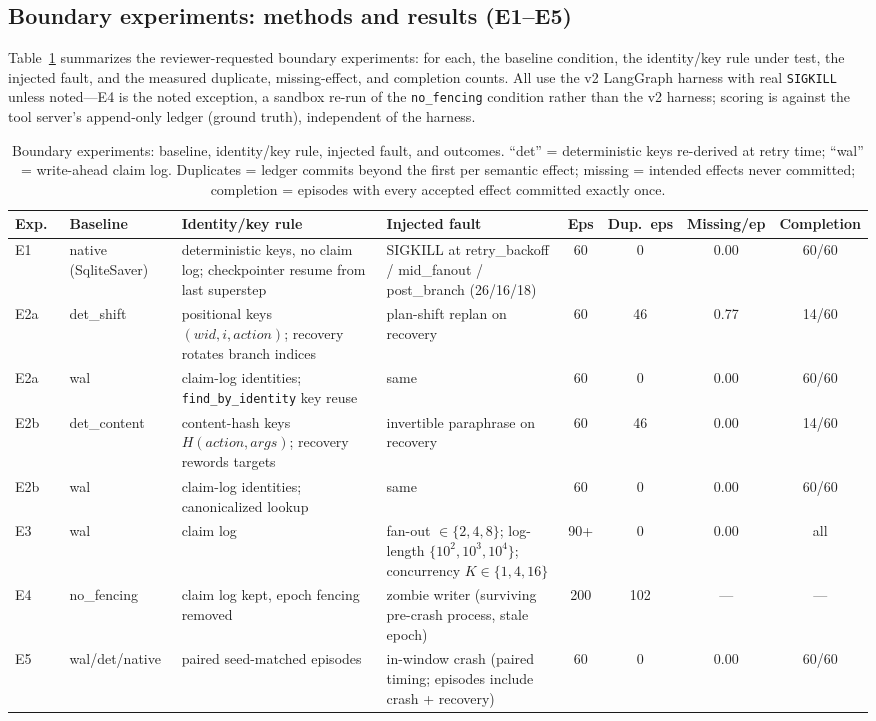 \documentclass[10pt,journal,compsoc]{IEEEtran}
\begin{document}
\subsection{Boundary experiments: methods and results (E1--E5)}

Table~\ref{tab:boundary} summarizes the reviewer-requested
boundary experiments: for each, the baseline condition, the
identity/key rule under test, the injected fault, and the
measured duplicate, missing-effect, and completion counts.
All use the v2 LangGraph harness with real \texttt{SIGKILL}
unless noted---E4 is the noted exception, a sandbox re-run of
the \texttt{no\_fencing} condition rather than the v2 harness;
scoring is against the tool server's append-only ledger
(ground truth), independent of the harness.

\begin{table}[t]
\centering
\footnotesize
\caption{Boundary experiments: baseline, identity/key rule,
injected fault, and outcomes. ``det'' = deterministic keys
re-derived at retry time; ``wal'' = write-ahead claim log.
Duplicates = ledger commits beyond the first per semantic
effect; missing = intended effects never committed;
completion = episodes with every accepted effect committed
exactly once.}
\label{tab:boundary}
\begin{tabular}{p{1.4cm}p{2.2cm}p{2.6cm}p{2.4cm}cccc}
\toprule
Exp.\ & Baseline & Identity/key rule & Injected fault &
Eps & Dup.\ eps & Missing/ep & Completion \\
\midrule
E1 & native (SqliteSaver) & deterministic keys, no claim log; checkpointer resume from last superstep & SIGKILL at retry\_backoff / mid\_fanout / post\_branch (26/16/18) & 60 & 0 & 0.00 & 60/60 \\
E2a & det\_shift & positional keys $(\mathit{wid}, i, \mathit{action})$; recovery rotates branch indices & plan-shift replan on recovery & 60 & 46 & 0.77 & 14/60 \\
E2a & wal & claim-log identities; \texttt{find\_by\_identity} key reuse & same & 60 & 0 & 0.00 & 60/60 \\
E2b & det\_content & content-hash keys $H(\mathit{action}, \mathit{args})$; recovery rewords targets & invertible paraphrase on recovery & 60 & 46 & 0.00 & 14/60 \\
E2b & wal & claim-log identities; canonicalized lookup & same & 60 & 0 & 0.00 & 60/60 \\
E3 & wal & claim log & fan-out $\in\{2,4,8\}$; log-length $\{10^2,10^3,10^4\}$; concurrency $K\in\{1,4,16\}$ & 90+ & 0 & 0.00 & all \\
E4 & no\_fencing & claim log kept, epoch fencing removed & zombie writer (surviving pre-crash process, stale epoch) & 200 & 102 & --- & --- \\
E5 & wal/det/native & paired seed-matched episodes & in-window crash (paired timing; episodes include crash + recovery) & 60 & 0 & 0.00 & 60/60 \\
\bottomrule
\end{tabular}
\end{table}
\end{document}

